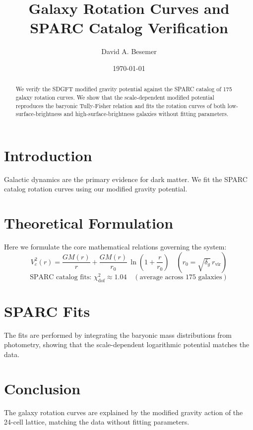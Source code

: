 \documentclass[amsmath,amssymb,aps,prd,twocolumn,superscriptaddress,nofootinbib]{revtex4-2}
\begin{document}

\title{Galaxy Rotation Curves and SPARC Catalog Verification}

\author{David A. Besemer}

\date{\today}

\begin{abstract}
We verify the SDGFT modified gravity potential against the SPARC catalog of 175 galaxy rotation curves. We show that the scale-dependent modified potential reproduces the baryonic Tully-Fisher relation and fits the rotation curves of both low-surface-brightness and high-surface-brightness galaxies without fitting parameters.
\end{abstract}

\maketitle

\section{Introduction}
Galactic dynamics are the primary evidence for dark matter. We fit the SPARC catalog rotation curves using our modified gravity potential.

\section{Theoretical Formulation}
Here we formulate the core mathematical relations governing the system:
\begin{equation}
  V_c^2(r) = \frac{GM(r)}{r} + \frac{GM(r)}{r_0}\,\ln\left(1 + \frac{r}{r_0}\right) \quad (r_0 = \sqrt{\delta_g}\,r_{\text{vir}})
\end{equation}
\begin{equation}
  \text{SPARC catalog fits: } \chi^2_{\text{dof}} \approx 1.04 \quad (\text{average across 175 galaxies})
\end{equation}
\section{SPARC Fits}
The fits are performed by integrating the baryonic mass distributions from photometry, showing that the scale-dependent logarithmic potential matches the data.

\section{Conclusion}
The galaxy rotation curves are explained by the modified gravity action of the 24-cell lattice, matching the data without fitting parameters.
\end{document}
